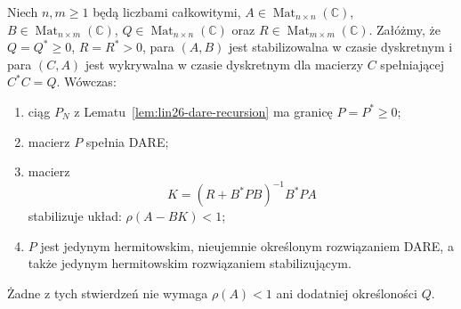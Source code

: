 \begin{twierdzenie}
\label{thm:lin26-dare}
Niech \(n,m\ge1\) będą liczbami całkowitymi,
\(A\in\operatorname{Mat}_{n\times n}(\mathbb C)\),
\(B\in\operatorname{Mat}_{n\times m}(\mathbb C)\),
\(Q\in\operatorname{Mat}_{n\times n}(\mathbb C)\)
oraz \(R\in\operatorname{Mat}_{m\times m}(\mathbb C)\).
Załóżmy, że \(Q=Q^*\ge0\), \(R=R^*>0\),
para \((A,B)\) jest
stabilizowalna w czasie
dyskretnym i para
\((C,A)\) jest wykrywalna
w czasie dyskretnym
dla macierzy \(C\)
spełniającej \(C^*C=Q\).
Wówczas:
\begin{enumerate}[label=\textup{(\roman*)}]
 \item ciąg \(P_N\)
 z Lematu~\ref{lem:lin26-dare-recursion}
 ma granicę \(P=P^*\ge0\);
 \item macierz \(P\)
 spełnia DARE;
 \item macierz
 \[
 K=(R+B^*PB)^{-1}B^*PA
 \]
 stabilizuje układ:
 \(\rho(A-BK)<1\);
 \item \(P\) jest jedynym
 hermitowskim, nieujemnie
 określonym rozwiązaniem DARE,
 a także jedynym
 hermitowskim rozwiązaniem
 stabilizującym.
\end{enumerate}
Żadne z tych stwierdzeń
nie wymaga \(\rho(A)<1\)
ani dodatniej określoności \(Q\).
\end{twierdzenie}
